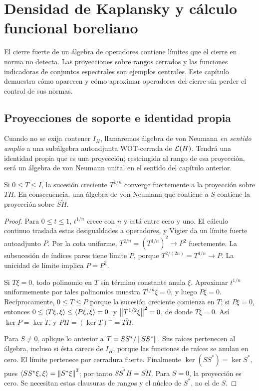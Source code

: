 \chapter{Densidad de Kaplansky y cálculo funcional boreliano}\label{cap:v3-17}

El cierre fuerte de un álgebra de operadores contiene límites que el cierre en norma no detecta. Las proyecciones sobre rangos cerrados y las funciones indicadoras de conjuntos espectrales son ejemplos centrales. Este capítulo demuestra cómo aparecen y cómo aproximar operadores del cierre sin perder el control de sus normas.

\section{Proyecciones de soporte e identidad propia}\label{lec:v3-33}

Cuando no se exija contener $I_H$, llamaremos álgebra de von Neumann \emph{en sentido amplio} a una subálgebra autoadjunta WOT-cerrada de $\mathcal L(H)$. Tendrá una identidad propia que es una proyección; restringida al rango de esa proyección, será un álgebra de von Neumann unital en el sentido del capítulo anterior.

\begin{teorema}\label{v3:proyeccion-soporte}
Si $0\le T\le I$, la sucesión creciente $T^{1/n}$ converge fuertemente a la proyección sobre $\overline{TH}$. En consecuencia, una álgebra de von Neumann que contiene a $S$ contiene la proyección sobre $\overline{SH}$.
\end{teorema}
\begin{proof}
Para $0\le t\le1$, $t^{1/n}$ crece con $n$ y está entre cero y uno. El cálculo continuo traslada estas desigualdades a operadores, y Vigier da un límite fuerte autoadjunto $P$. Por la cota uniforme, $T^{2/n}=(T^{1/n})^2\to P^2$ fuertemente. La subsucesión de índices pares tiene límite $P$, porque $T^{2/(2n)}=T^{1/n}\to P$. La unicidad de límite implica $P=P^2$.

Si $T\xi=0$, todo polinomio en $T$ sin término constante anula $\xi$. Aproximar $t^{1/n}$ uniformemente por tales polinomios muestra $T^{1/n}\xi=0$, y luego $P\xi=0$. Recíprocamente, $0\le T\le P$ porque la sucesión creciente comienza en $T$; si $P\xi=0$, entonces $0\le\left\langle T\xi,\xi\right\rangle\le\left\langle P\xi,\xi\right\rangle=0$, y $\left\lVert T^{1/2}\xi\right\rVert^2=0$, de donde $T\xi=0$. Así $\ker P=\ker T$, y $PH=(\ker T)^\perp=\overline{TH}$.

Para $S\ne0$, aplique lo anterior a $T=SS^*/\left\lVert SS^*\right\rVert$. Sus raíces pertenecen al álgebra, incluso si ésta carece de $I_H$, porque las funciones de raíces se anulan en cero. El límite pertenece por cerradura fuerte. Finalmente $\ker(SS^*)=\ker S^*$, pues $\left\langle SS^*\xi,\xi\right\rangle=\left\lVert S^*\xi\right\rVert^2$; por tanto $\overline{SS^*H}=\overline{SH}$. Para $S=0$, la proyección es cero. Se necesitan estas clausuras de rangos y el núcleo de $S^*$, no el de $S$.
\end{proof}

